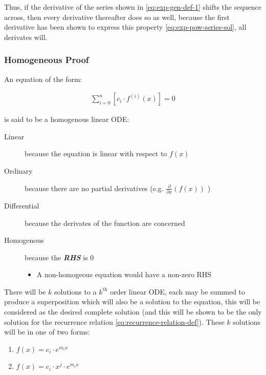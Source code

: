 \documentclass[11pt]{article}
\begin{document}
Thus, if the derivative of the series shown in \eqref{eq:exp-gen-def-1} shifts the
sequence across, then every derivative thereafter does so as well, because the
first derivative has been shown to express this property
\eqref{eq:exp-pow-series-sol}, all derivates will.

\subsubsection{Homogeneous Proof}
\label{sec:orgfafd6a9}
An equation of the form:

\begin{align}
\sum^{n}_{i=0} \left[ c_{i} \cdot f^{(i)}(x) \right] = 0 \label{eq:hom-ode}
\end{align}

is said to be a homogenous linear ODE: \cite[Ch. 2]{zillDifferentialEquations2009a}

\begin{description}
\item[{Linear}] because the equation is linear with respect to \(f(x)\)
\item[{Ordinary}] because there are no partial derivatives (e.g. \(\frac{\partial }{\partial x}{\left({ f{\left({ x }\right)} }\right)}\)  )
\item[{Differential}] because the derivates of the function are concerned
\item[{Homogenous}] because the \textbf{\emph{RHS}} is 0
\begin{itemize}
\item A non-homogeous equation would have a non-zero RHS
\end{itemize}
\end{description}

There will be \(k\) solutions to a \(k^{\mathrm{th}}\) order linear ODE, each may be summed to produce a superposition which will also be a solution to the equation, \cite[Ch. 4]{zillDifferentialEquations2009a}  this will be considered as the desired complete solution (and this will be shown to be the only solution for the recurrence relation \eqref{eq:recurrence-relation-def}). These \(k\) solutions will be in one of two forms:

\begin{enumerate}
\item \(f(x)=c_{i} \cdot e^{m_{i}x}\)
\item \(f(x)=c_{i} \cdot x^{j}\cdot e^{m_{i}x}\)
\end{enumerate}
\end{document}
